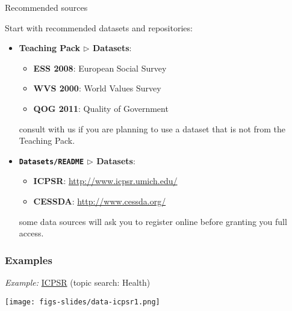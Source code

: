 \documentclass{beamer}
\begin{document}
	\begin{frame}[t]{Recommended sources}
	
	Start with recommended datasets and repositories:

		\begin{itemize}
		\item \textbf{Teaching Pack $\triangleright$ Datasets}:

				\begin{itemize}
				\item \textbf{ESS 2008}: European Social Survey

				\item \textbf{WVS 2000}: World Values Survey

				\item \textbf{QOG 2011}: Quality of Government
			\end{itemize}
			
			 consult with us if you are planning to use a dataset that is not from the Teaching Pack.

			\item \textbf{\texttt{Datasets/README} $\triangleright$ Datasets}:
		
			\begin{itemize}
				\item \textbf{ICPSR}: \url{http://www.icpsr.umich.edu/}
		
				\item \textbf{CESSDA}: \url{http://www.cessda.org/}
		
			\end{itemize}
					
			 some data sources will ask you to register online before granting you full access.
				
		\end{itemize}
	
	\end{frame}

	\subsubsection{Examples}
	
	\begin{frame}[t]{\textit{Example:} \href{http://www.icpsr.umich.edu/}{ICPSR} (topic search: Health)}

	\texttt{[image: figs-slides/data-icpsr1.png]}

	\end{frame}
\end{document}
